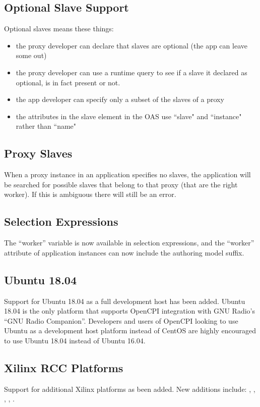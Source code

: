 \subsection{Optional Slave Support}
\label{sec:20_optional_slave_support}
Optional slaves means these things:
\begin{itemize}
\item the proxy developer can declare that slaves are optional (the app can leave some out)
\item the proxy developer can use a runtime query to see if a slave it declared as optional, is in fact present or not.
\item the app developer can specify only a subset of the slaves of a proxy
\item the attributes in the slave element in the OAS use ``slave" and ``instance" rather than ``name"
\end{itemize}

\subsection{Proxy Slaves}
\label{sec:20_proxy_slaves}
When a proxy instance in an application specifies no slaves, the application will be searched for possible slaves that belong to that proxy (that are the right worker).  If this is ambiguous there will still be an error.

\subsection{Selection Expressions}
\label{sec:20_selection_expressions}
The ``worker'' variable is now available in selection expressions, and the ``worker'' attribute of application instances can now include the authoring model suffix.

\subsection{Ubuntu 18.04}
\label{sec:20_ubuntu18}
Support for Ubuntu 18.04 as a full development host has been added. Ubuntu 18.04 is the only platform that supports OpenCPI integration with GNU Radio's ``GNU Radio Companion''. Developers and users of OpenCPI looking to use Ubuntu as a development host platform instead of CentOS are highly encouraged to use Ubuntu 18.04 instead of Ubuntu 16.04.

\subsection{Xilinx RCC Platforms}
\label{sec:20_xilinx_rcc_platforms}
Support for additional Xilinx platforms as been added. New additions include: , , , , .\\

